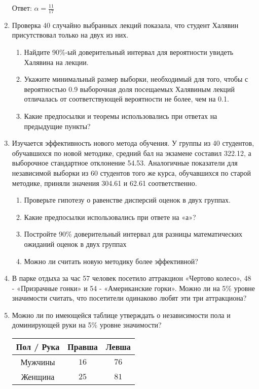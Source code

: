 \begin{enumerate}
Ответ: $\alpha=\frac{11}{17}$

\item Проверка 40 случайно выбранных лекций показала, что студент
Халявин присутствовал только на двух из них.
\begin{enumerate}
\item Найдите 90\%-ый доверительный интервал для вероятности
увидеть Халявина на лекции.
\item Укажите минимальный размер выборки, необходимый для того,
чтобы с вероятностью 0.9 выборочная доля посещаемых Халявиным
лекций отличалась от соответствующей вероятности не более, чем на 0.1.
\item Какие предпосылки и теоремы использовались при ответах на предыдущие пункты?
\end{enumerate}

\item Изучается эффективность нового метода обучения. У группы из 40
студентов, обучавшихся по новой методике, средний бал на экзамене
составил 322.12, а выборочное стандартное отклонение 54.53.
Аналогичные показатели для независимой выборки из 60 студентов
того же курса, обучавшихся по старой методике,
приняли значения 304.61 и 62.61 соответственно.
\begin{enumerate}
\item Проверьте гипотезу о равенстве дисперсий оценок в двух
группах.
\item Какие предпосылки использовались при ответе на «а»?
\item Постройте 90\% доверительный интервал для разницы
математических ожиданий оценок в двух группах
\item Можно ли считать новую методику более эффективной?
\end{enumerate}

\item В парке отдыха за час 57 человек посетило аттракцион «Чертово
колесо», 48 - «Призрачные гонки» и 54 - «Американские горки». Можно ли на 5\% уровне значимости считать, что посетители
одинаково любят эти три аттракциона?

\item Можно ли по имеющейся таблице утверждать о независимости пола и
доминирующей руки на 5\% уровне значимости?

\begin{tabular}{@{}ccc@{}}
\toprule
Пол / Рука & Правша & Левша \\ \midrule
Мужчины    & $16$     & $76$    \\
Женщина    & $25$     & $81$ \\ \bottomrule
\end{tabular}


\end{enumerate}
